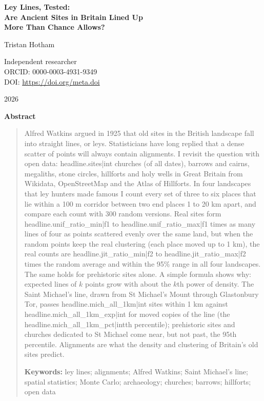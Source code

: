 \documentclass[11pt,a4paper]{article}
\begin{document}
\begin{center}
{\LARGE\bfseries Ley Lines, Tested:\\[0.2em] Are Ancient Sites in Britain Lined Up\\[0.2em] More Than Chance Allows?\par}
\vspace{1.4em}
{\large Tristan Hotham\par}
\vspace{0.3em}
{\small Independent researcher\\
ORCID: 0000-0003-4931-9349\\
DOI: \href{https://doi.org/{{meta.doi}}}{https://doi.org/{{meta.doi}}}\par}
\vspace{1em}
{\small 2026\par}
\end{center}

\vspace{0.5em}
\begin{center}\textbf{Abstract}\end{center}
\begin{quote}\small
Alfred Watkins argued in 1925 that old sites in the British landscape fall into straight lines, or leys. Statisticians have long replied that a dense scatter of points will always contain alignments. I revisit the question with open data: {{headline.sites|int}} churches (of all dates), barrows and cairns, megaliths, stone circles, hillforts and holy wells in Great Britain from Wikidata, OpenStreetMap and the Atlas of Hillforts. In four landscapes that ley hunters made famous I count every set of three to six places that lie within a 100 m corridor between two end places 1 to 20 km apart, and compare each count with 300 random versions. Real sites form {{headline.unif_ratio_min|f1}} to {{headline.unif_ratio_max|f1}} times as many lines of four as points scattered evenly over the same land, but when the random points keep the real clustering (each place moved up to 1 km), the real counts are {{headline.jit_ratio_min|f2}} to {{headline.jit_ratio_max|f2}} times the random average and within the 95\% range in all four landscapes. The same holds for prehistoric sites alone. A simple formula shows why: expected lines of $k$ points grow with about the $k$th power of density. The Saint Michael's line, drawn from St Michael's Mount through Glastonbury Tor, passes {{headline.mich_all_1km|int}} sites within 1 km against {{headline.mich_all_1km_exp|int}} for moved copies of the line (the {{headline.mich_all_1km_pct|int}}th percentile); prehistoric sites and churches dedicated to St Michael come near, but not past, the 95th percentile. Alignments are what the density and clustering of Britain's old sites predict.

\medskip
\textbf{Keywords:} ley lines; alignments; Alfred Watkins; Saint Michael's line; spatial statistics; Monte Carlo; archaeology; churches; barrows; hillforts; open data
\end{quote}
\end{document}
